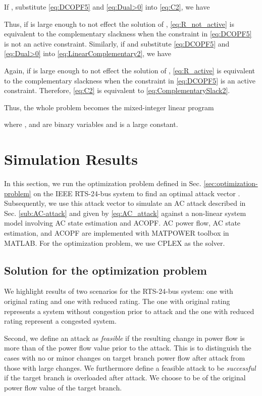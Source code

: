 \documentclass[twocolumn,english,final,journal]{IEEEtran}
\theoremstyle{plain}
\theoremstyle{definition}
\begin{document}
If , substitute \eqref{eq:DCOPF5} and \eqref{eq:Dual>0}
into \eqref{eq:C2}, we have 

Thus, if  is large enough to not effect the solution of ,
\eqref{eq:R_not_active} is equivalent to the complementary slackness
when the  constraint in \eqref{eq:DCOPF5} is not
an active constraint. 
Similarly, if  and substitute \eqref{eq:DCOPF5}
and \eqref{eq:Dual>0} into \eqref{eq:LinearComplementary2}, we have

Again, if  is large enough to not effect the solution of ,
\eqref{eq:R_active} is equivalent to the complementary slackness
when the  constraint in \eqref{eq:DCOPF5} is an
active constraint. Therefore, \eqref{eq:C2} is equivalent to \eqref{eq:ComplementarySlack2}.

Thus, the whole problem becomes the mixed-integer linear program

where ,  and 
are binary variables and  is a large constant. 


\section{Simulation Results \label{sec:Simulation-Results}}

In this section, we run the optimization problem defined in Sec. \ref{sec:optimization-problem}
on the IEEE RTS-24-bus system to find an optimal attack vector . Subsequently, we use this attack
vector  to simulate an AC attack described in Sec. \ref{sub:AC-attack}
and given by \eqref{eq:AC_attack} against a non-linear system model
involving AC state estimation and ACOPF. AC power flow, AC state estimation,
and ACOPF are implemented with MATPOWER toolbox in MATLAB. For the
optimization problem, we use CPLEX as the solver. 


\subsection{Solution for the optimization problem\label{sub:Solution-for-the}}

We highlight results of two scenarios for the RTS-24-bus system: one
with original rating and one with reduced rating. The one with original
rating represents a system without congestion prior to attack and
the one with reduced rating represent a congested system.

Second, we define an attack as \emph{feasible} if the resulting change
in power flow is more than  of the power flow value prior to
the attack. This is to distinguish the cases with no or minor changes
on target branch power flow  after attack from those with
large changes. We furthermore define a feasible attack to be \emph{successful}
if the target branch is overloaded after attack. We choose 
to be  of the original power flow value of the target branch.
\end{document}
